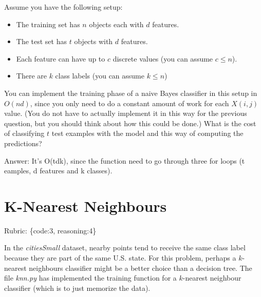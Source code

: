 \documentclass{article}
\def\rubric#1{\gre{Rubric: \{#1\}}}{}
\def\ans#1{\par\gre{Answer: #1}}
\def\blu#1{{\color{blu}#1}}
\def\gre#1{{\color{gre}#1}}
\def\items#1{\begin{itemize}#1\end{itemize}}
\begin{document}
Assume you have the following setup:
\items{
\item The training set has $n$ objects each with $d$ features.
\item The test set has $t$ objects with $d$ features.
\item Each feature can have up to $c$ discrete values (you can assume $c \leq n$).
\item There are $k$ class labels (you can assume $k \leq n$)
}
You can implement the training phase of a naive Bayes classifier in this setup in $O(nd)$, since you only need to do a constant amount of work for each $X(i,j)$ value. (You do not have to actually implement it in this way for the previous question, but you should think about how this could be done.)
 \blu{What is the cost of classifying $t$ test examples with the model and this way of computing the predictions?}
\ans{It's O(tdk), since the function need to go through three for loops (t eamples, d features and k classes).}

\section{K-Nearest Neighbours}
\rubric{code:3, reasoning:4}

In the \emph{citiesSmall} dataset, nearby points tend to receive the same class label because they are part of the same U.S. state. For this problem, perhaps a $k$-nearest neighbours classifier might be a better choice than a decision tree. The file \emph{knn.py} has implemented the training function for a $k$-nearest neighbour classifier (which is to just memorize the data).
\end{document}
